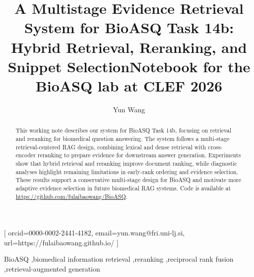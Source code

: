 \documentclass[
]{ceurart}
\begin{document}


\title{A Multistage Evidence Retrieval System for BioASQ Task 14b:
Hybrid Retrieval, Reranking, and Snippet Selection}

\title[mode=sub]{Notebook for the BioASQ lab at CLEF 2026}




\author[1]{Yun Wang}[%
orcid=0000-0002-2441-4182,
email=yun.wang@fri.uni-lj.si,
url=https://fulaibaowang.github.io/
]
\cormark[1]
\address[1]{University of Ljubljana, Faculty of Computer and Information Science,
  Ve\v{c}na pot 113, 1000 Ljubljana, Slovenia}


\begin{abstract}
  This working note describes our system for BioASQ Task 14b, focusing on retrieval and reranking for biomedical question answering. The system follows a multi-stage retrieval-centered RAG design, combining lexical and dense retrieval with cross-encoder reranking to prepare evidence for downstream answer generation. Experiments show that hybrid retrieval and reranking improve document ranking, while diagnostic analyses highlight remaining limitations in early-rank ordering and evidence selection. These results support a conservative multi-stage design for BioASQ and motivate more adaptive evidence selection in future biomedical RAG systems. Code is available at \url{https://github.com/fulaibaowang/BioASQ}.

\end{abstract}

\begin{keywords}
BioASQ \sep biomedical information retrieval \sep reranking \sep reciprocal rank fusion \sep retrieval-augmented generation
\end{keywords}
\end{document}
